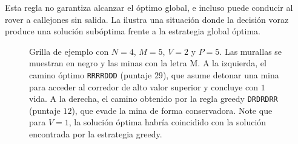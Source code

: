 Esta regla no garantiza alcanzar el óptimo global, e incluso puede conducir al rover a callejones sin salida. La  ilustra una situación donde la decisión voraz produce una solución subóptima frente a la estrategia global óptima.

\newcommand{\minacelda}{\textcolor{red!70!black}{\textbf{M}}}
\newcommand{\grillaejemplo}{%
  \foreach \i/\j in {1/2,3/0} {
    \fill[black!70] (\j,-\i) rectangle ++(1,-1);
  }
  \foreach \fila [count=\i from 0] in {{1,\minacelda,8,8,8},{2,3,{},-2,6},{-3,4,-2,-3,2},{{},-4,1,2,1}} {
    \foreach \valor [count=\j from 0] in \fila {
      \draw (\j,-\i) rectangle ++(1,-1);
      \node at (\j+0.5,-\i-0.5) {\(\valor\)};
    }
  }%
}

\begin{figure}[H]
  \centering
  \caption{Grilla de ejemplo con $N = 4$, $M = 5$, $V = 2$ y $P = 5$. Las murallas se muestran en negro y las minas con la letra M. A la izquierda, el camino óptimo \texttt{RRRRDDD} (puntaje $29$), que asume detonar una mina para acceder al corredor de alto valor superior y concluye con $1$ vida. A la derecha, el camino obtenido por la regla greedy \texttt{DRDRDRR} (puntaje $12$), que evade la mina de forma conservadora. Note que para $V=1$, la solución óptima habría coincidido con la solución encontrada por la estrategia greedy.}
  \label{fig:ejemplo-grilla}
\end{figure}
